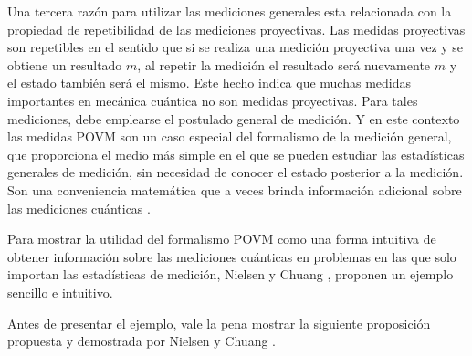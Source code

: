 Una tercera razón para utilizar las mediciones generales esta relacionada con la propiedad de repetibilidad de las mediciones proyectivas. Las medidas proyectivas son repetibles en el sentido que si se realiza una medición proyectiva una vez y se obtiene un resultado $m$, al repetir la medición el resultado será nuevamente $m$ y el estado también será el mismo. Este hecho indica que muchas medidas importantes en mecánica cuántica no son medidas proyectivas.  Para tales mediciones, debe emplearse el postulado general de medición. Y en este contexto las medidas POVM son un caso especial del formalismo de la medición general, que proporciona el medio más simple en el que se pueden estudiar las estadísticas generales de medición, sin necesidad de conocer el estado posterior a la medición. Son una conveniencia matemática que a veces brinda información adicional sobre las mediciones cuánticas {\cite{nielsen_chuang_2010}}.


Para mostrar la utilidad del formalismo POVM como una forma intuitiva de
obtener información sobre las mediciones cuánticas en problemas en las que solo
importan las estadísticas de medición, Nielsen y Chuang
{\cite{nielsen_chuang_2010}}, proponen un ejemplo sencillo e intuitivo.

Antes de presentar el ejemplo, vale la pena mostrar la siguiente proposición
propuesta y demostrada por Nielsen y Chuang {\cite{nielsen_chuang_2010}}.

